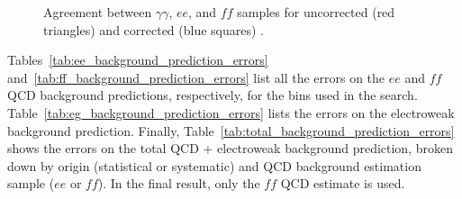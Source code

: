 \documentclass[dissertation.tex]{subfiles}
\begin{document}
\begin{figure}
	\hspace{1cm}
	\caption{Agreement between $\gamma\gamma$, $ee$, and $\mathit{ff}$ samples for uncorrected (red triangles) and corrected (blue squares) \MET.}
	\label{fig:Type-I_MET_corrections_vs_uncorrected_MET_zoom}
\end{figure}

Tables~\ref{tab:ee_background_prediction_errors} and~\ref{tab:ff_background_prediction_errors} list all the errors on the $ee$ and $\mathit{ff}$ QCD background predictions, respectively, for the \MET bins used in the search.  Table~\ref{tab:eg_background_prediction_errors} lists the errors on the electroweak background prediction.  Finally, Table~\ref{tab:total_background_prediction_errors} shows the errors on the total QCD + electroweak background prediction, broken down by origin (statistical or systematic) and QCD background estimation sample ($ee$ or $\mathit{ff}$).  In the final result, only the $\mathit{ff}$ QCD estimate is used.
\end{document}
